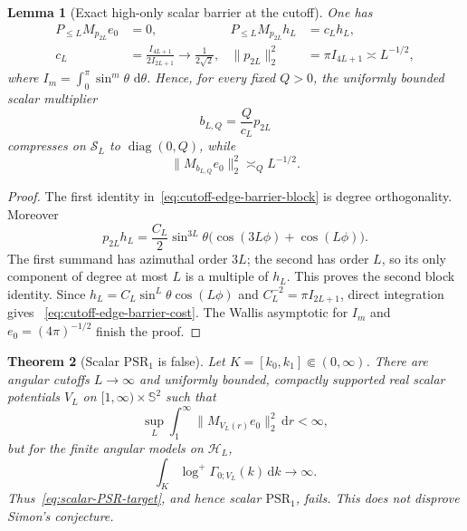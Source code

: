 \documentclass[11pt]{article}
\newcommand{\dd}{\,\mathrm d}
\DeclareMathOperator{\diag}{diag}
\newtheorem{theorem}{Theorem}[section]
\newtheorem{lemma}[theorem]{Lemma}
\theoremstyle{definition}
\theoremstyle{remark}
\begin{document}
\begin{lemma}[Exact high-only scalar barrier at the cutoff]
\label{lem:exact-cutoff-edge-barrier}
One has
\begin{align}
 P_{\leq L}M_{p_{2L}}e_0&=0,
 &P_{\leq L}M_{p_{2L}}h_L&=c_Lh_L,
 \label{eq:cutoff-edge-barrier-block}\\
 c_L&=\frac{I_{4L+1}}{2I_{2L+1}}\longrightarrow\frac1{2\sqrt2},
 &\|p_{2L}\|_2^2&=\pi I_{4L+1}\asymp L^{-1/2},
 \label{eq:cutoff-edge-barrier-cost}
\end{align}
where $I_m=\int_0^\pi\sin^m\theta\,\dd\theta$.  Hence, for every fixed
$Q>0$, the uniformly bounded scalar multiplier
\begin{equation}
 b_{L,Q}=\frac{Q}{c_L}p_{2L}
 \label{eq:exact-cutoff-edge-barrier-potential}
\end{equation}
compresses on $\mathcal S_L$ to $\diag(0,Q)$, while
\begin{equation}
 \|M_{b_{L,Q}}e_0\|_2^2\asymp_Q L^{-1/2}.
 \label{eq:exact-cutoff-edge-barrier-charged-cost}
\end{equation}
\end{lemma}

\begin{proof}
The first identity in~\eqref{eq:cutoff-edge-barrier-block} is degree
orthogonality.  Moreover
\begin{equation}
 p_{2L}h_L
 =\frac{C_L}{2}\sin^{3L}\theta
   \bigl(\cos(3L\phi)+\cos(L\phi)\bigr).
\end{equation}
The first summand has azimuthal order $3L$; the second has order $L$, so its
only component of degree at most $L$ is a multiple of $h_L$.  This proves the
second block identity.  Since
$h_L=C_L\sin^L\theta\cos(L\phi)$ and
$C_L^{-2}=\pi I_{2L+1}$, direct integration gives
~\eqref{eq:cutoff-edge-barrier-cost}.  The Wallis asymptotic for $I_m$ and
$e_0=(4\pi)^{-1/2}$ finish the proof.
\end{proof}

\begin{theorem}[Scalar $\mathrm{PSR}_1$ is false]
\label{thm:scalar-PSR1-counterexample}
Let $K=[k_0,k_1]\Subset(0,\infty)$.  There are angular cutoffs $L\to\infty$
and uniformly bounded, compactly supported real scalar potentials $V_L$ on
$[1,\infty)\times\mathbb S^2$ such that
\begin{equation}
 \sup_L\int_1^\infty\|M_{V_L(r)}e_0\|_2^2\dd r<\infty,
 \label{eq:scalar-PSR1-counterexample-cost}
\end{equation}
but for the finite angular models on $\mathcal H_L$,
\begin{equation}
 \int_K\log^+\Gamma_{0;V_L}(k)\dd k\longrightarrow\infty.
 \label{eq:scalar-PSR1-counterexample-entropy}
\end{equation}
Thus~\eqref{eq:scalar-PSR-target}, and hence scalar $\mathrm{PSR}_1$, fails.
This does not disprove Simon's conjecture.
\end{theorem}
\end{document}
